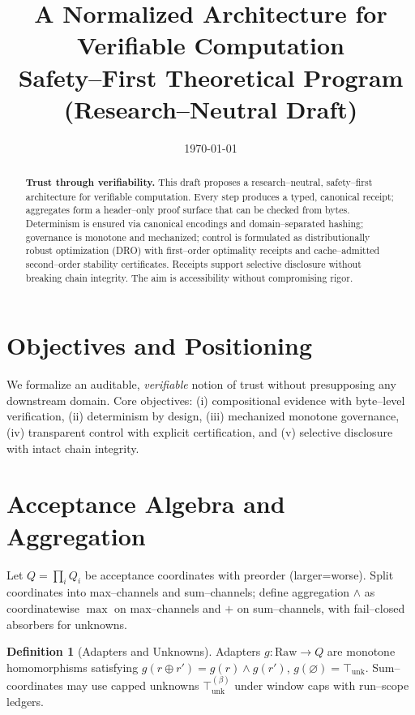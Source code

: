 \documentclass[11pt]{article}
\title{\vspace{-6pt}A Normalized Architecture for Verifiable Computation\\[2pt]
\large Safety--First Theoretical Program (Research--Neutral Draft)}
\author{}
\date{\today}
\def\to{→}%
\theoremstyle{plain}
\theoremstyle{definition}
\newtheorem{definition}[theorem]{Definition}
\theoremstyle{remark}
\begin{document}
\maketitle
\begin{abstract}
\noindent \textbf{Trust through verifiability.} This draft proposes a research--neutral, safety--first architecture for verifiable computation. Every step produces a typed, canonical receipt; aggregates form a header--only proof surface that can be checked from bytes. Determinism is ensured via canonical encodings and domain--separated hashing; governance is monotone and mechanized; control is formulated as distributionally robust optimization (DRO) with first--order optimality receipts and cache--admitted second--order stability certificates. Receipts support selective disclosure without breaking chain integrity. The aim is accessibility without compromising rigor.
\end{abstract}
\section{Objectives and Positioning}
\noindent We formalize an auditable, \emph{verifiable} notion of trust without presupposing any downstream domain. Core objectives: (i) compositional evidence with byte--level verification, (ii) determinism by design, (iii) mechanized monotone governance, (iv) transparent control with explicit certification, and (v) selective disclosure with intact chain integrity.
\section{Acceptance Algebra and Aggregation}
Let $Q=\prod_i Q_i$ be acceptance coordinates with preorder (larger=worse). Split coordinates into max--channels and sum--channels; define aggregation $\wedge$ as coordinatewise $\max$ on max--channels and $+$ on sum--channels, with fail--closed absorbers for unknowns.
\begin{definition}[Adapters and Unknowns]
Adapters $g:\mathrm{Raw}\to Q$ are monotone homomorphisms satisfying $g(r\oplus r')=g(r)\wedge g(r')$, $g(\varnothing)=\top_{\mathrm{unk}}$. Sum--coordinates may use capped unknowns $\top_{\mathrm{unk}}^{(\beta)}$ under window caps with run--scope ledgers.
\end{definition}
\end{document}
